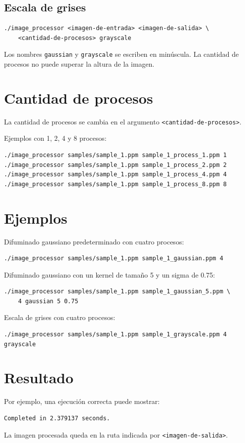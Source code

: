 \documentclass[11pt]{article}
\begin{document}
\subsection*{Escala de grises}

\begin{lstlisting}
./image_processor <imagen-de-entrada> <imagen-de-salida> \
    <cantidad-de-procesos> grayscale
\end{lstlisting}

Los nombres \texttt{gaussian} y \texttt{grayscale} se escriben en minúscula.
La cantidad de procesos no puede superar la altura de la imagen.

\section*{Cantidad de procesos}

La cantidad de procesos se cambia en el argumento
\verb|<cantidad-de-procesos>|.

Ejemplos con 1, 2, 4 y 8 procesos:

\begin{lstlisting}
./image_processor samples/sample_1.ppm sample_1_process_1.ppm 1
./image_processor samples/sample_1.ppm sample_1_process_2.ppm 2
./image_processor samples/sample_1.ppm sample_1_process_4.ppm 4
./image_processor samples/sample_1.ppm sample_1_process_8.ppm 8
\end{lstlisting}

\section*{Ejemplos}

Difuminado gaussiano predeterminado con cuatro procesos:

\begin{lstlisting}
./image_processor samples/sample_1.ppm sample_1_gaussian.ppm 4
\end{lstlisting}

Difuminado gaussiano con un kernel de tamaño 5 y un sigma de 0.75:

\begin{lstlisting}
./image_processor samples/sample_1.ppm sample_1_gaussian_5.ppm \
    4 gaussian 5 0.75
\end{lstlisting}

Escala de grises con cuatro procesos:

\begin{lstlisting}
./image_processor samples/sample_1.ppm sample_1_grayscale.ppm 4 grayscale
\end{lstlisting}

\section*{Resultado}

Por ejemplo, una ejecución correcta puede mostrar:

\begin{lstlisting}
Completed in 2.379137 seconds.
\end{lstlisting}

La imagen procesada queda en la ruta indicada por
\verb|<imagen-de-salida>|.
\end{document}
